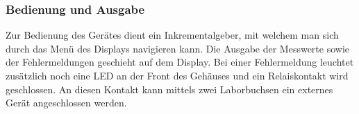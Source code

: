 \subsubsection{Bedienung und Ausgabe}
Zur Bedienung des Gerätes dient ein Inkrementalgeber, mit welchem man sich durch das Menü des Displays navigieren kann. Die Ausgabe der Messwerte sowie der Fehlermeldungen geschieht auf dem Display. Bei einer Fehlermeldung leuchtet zusätzlich noch eine LED an der Front des Gehäuses und ein Relaiskontakt wird geschlossen. An diesen Kontakt kann mittels zwei Laborbuchsen ein externes Gerät angeschlossen werden.


